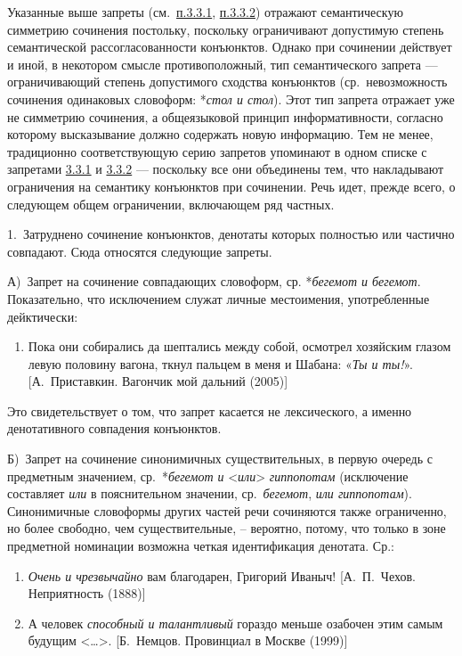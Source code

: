 Указанные выше запреты (см.~\underline{п.3.3.1}, \underline{п.3.3.2})
отражают семантическую симметрию сочинения постольку, поскольку
ограничивают допустимую степень семантической рассогласованности
конъюнктов. Однако при сочинении действует и иной, в некотором смысле
противоположный, тип семантического запрета --- ограничивающий степень
допустимого сходства конъюнктов (ср.~невозможность сочинения одинаковых
словоформ: *\textit{стол и стол}). Этот тип запрета отражает уже не
симметрию сочинения, а общеязыковой принцип информативности, согласно
которому высказывание должно содержать новую информацию. Тем не менее,
традиционно соответствующую серию запретов упоминают в одном списке с
запретами \underline{3.3.1} и \underline{3.3.2} --- поскольку все они
объединены тем, что накладывают ограничения на семантику конъюнктов при
сочинении. Речь идет, прежде всего, о следующем общем ограничении,
включающем ряд частных.

1.~Затруднено сочинение конъюнктов, денотаты которых полностью или
частично совпадают. Сюда относятся следующие запреты.

А)~Запрет на сочинение совпадающих словоформ, ср. *\textit{бегемот и
бегемот}. Показательно, что исключением служат личные местоимения,
употребленные дейктически:

\begin{enumerate}
\def\labelenumi{(\arabic{enumi})}
\setcounter{enumi}{17}
\item
  Пока они собирались да шептались между собой, осмотрел хозяйским
  глазом левую половину вагона, ткнул пальцем в меня и Шабана: «\textit{Ты
  и ты!}». {[}А.~Приставкин. Вагончик мой дальний (2005){]}
\end{enumerate}

Это свидетельствует о том, что запрет касается не лексического, а именно
денотативного совпадения конъюнктов.

Б)~Запрет на сочинение синонимичных существительных, в первую очередь с
предметным значением, ср.~*\textit{бегемот и}
\textless{}\textit{или}\textgreater{} \textit{гиппопотам} (исключение
составляет \textit{или} в пояснительном значении, ср.~\textit{бегемот},
\textit{или гиппопотам}). Синонимичные словоформы других частей речи
сочиняются также ограниченно, но более свободно, чем существительные, --
вероятно, потому, что только в зоне предметной номинации возможна четкая
идентификация денотата. Ср.:

\begin{enumerate}
\def\labelenumi{(\arabic{enumi})}
\setcounter{enumi}{18}
\item
  \textit{Очень и чрезвычайно} вам благодарен, Григорий Иваныч!
  {[}А.~П.~Чехов. Неприятность (1888){]}
\item
  А человек \textit{способный и талантливый} гораздо меньше озабочен этим
  самым будущим \textless\ldots\textgreater. {[}Б.~Немцов. Провинциал в
  Москве (1999){]}
\end{enumerate}

